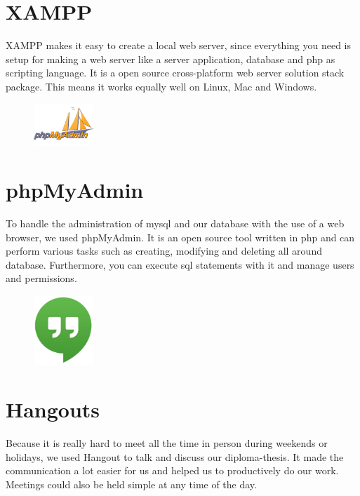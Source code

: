 \section{XAMPP}
XAMPP makes it easy to create a local web server, since everything you need is setup for making a web server like a server application, database and \gls{php} as scripting language. It is a open source cross-platform web server solution stack package. This means it works equally well on Linux, Mac and Windows.

\begin{figure}
  \begin{center}
    \includegraphics[width=0.2\textwidth] {bilder/phpMyAdmin}
  \end{center}
\end{figure}
\section{phpMyAdmin}
To handle the administration of \gls{mysql} and our database with the use of a web browser, we used phpMyAdmin. It is an open source tool written in \gls{php} and can perform various tasks such as creating, modifying and deleting all around database. Furthermore, you can execute \gls{sql} statements with it and manage users and permissions.

\begin{figure}
  \begin{center}
    \includegraphics[width=0.2\textwidth] {bilder/hangouts}
  \end{center}
\end{figure}
\section{Hangouts}
Because it is really hard to meet all the time in person during weekends or holidays, we used Hangout to talk and discuss our diploma-thesis. It made the communication a lot easier for us and helped us to productively do our work. Meetings could also be held simple at any time of the day.
